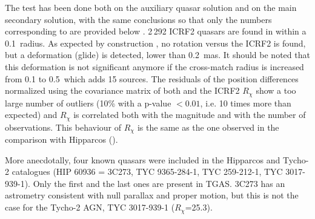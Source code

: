 The test has been done both on the auxiliary quasar solution and on the main {} secondary solution, with the same conclusions so that only the numbers corresponding to {} are provided below \citep[note that the priors used in their astrometric reduction are different,][]{DPACP-14,DPACP-26}.  
2\,292 ICRF2 quasars are found in {} within a 0.1\arcsec\ radius. As expected by construction \citep{DPACP-14}, no rotation versus the ICRF2 is found, but a deformation (glide) is detected, lower than 0.2~mas. It should be noted that this deformation is not significant anymore if the cross-match radius is increased from 0.1 to 0.5\arcsec\ which adds 15 sources. The residuals of the position differences normalized using the covariance matrix of both {} and the ICRF2 $R_\chi$ show a too large number of outliers (10\% with a p-value $<0.01$, i.e. 10 times more than expected) and $R_\chi$ is correlated both with the magnitude and with the number of observations. This behaviour of $R_\chi$ is the same as the one observed in the comparison with Hipparcos (). 
   

More anecdotally, four known quasars were included in the Hipparcos and Tycho-2 catalogues (HIP  60936 = 3C273, TYC 9365-284-1, TYC 259-212-1, TYC 3017-939-1). Only the first and the last ones are present in TGAS. 3C273 has an astrometry consistent with null parallax and proper motion, but this is not the case for the Tycho-2 AGN, TYC 3017-939-1 ($R_\chi$=25.3).



